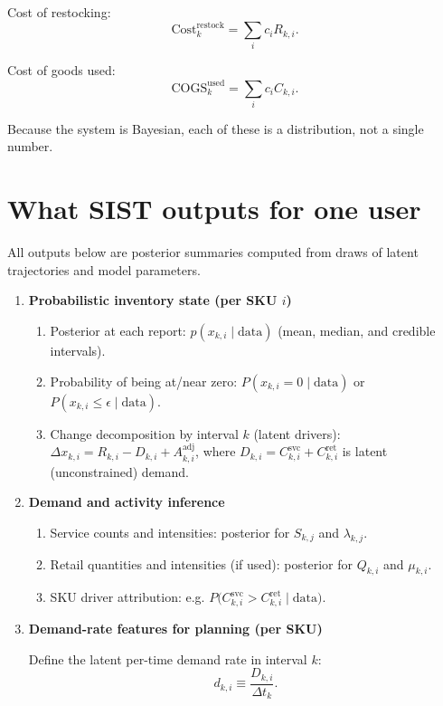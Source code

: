 \documentclass[11pt]{article}
\begin{document}
Cost of restocking:
\[
  \text{Cost}^{\mathrm{restock}}_k = \sum_i c_i R_{k,i}.
\]

Cost of goods used:
\[
  \text{COGS}^{\mathrm{used}}_k = \sum_i c_i C_{k,i}.
\]

Because the system is Bayesian, each of these is a distribution, not a single number.

\section{What SIST outputs for one user}

All outputs below are posterior summaries computed from draws of latent trajectories
and model parameters.

\begin{enumerate}
  \item \textbf{Probabilistic inventory state (per SKU $i$)}
  \begin{enumerate}
    \item Posterior at each report: $p(x_{k,i}\mid\text{data})$ (mean, median, and credible intervals).
    \item Probability of being at/near zero: $P(x_{k,i}=0\mid\text{data})$ or $P(x_{k,i}\le \epsilon\mid\text{data})$.
    \item Change decomposition by interval $k$ (latent drivers):
    $\Delta x_{k,i} = R_{k,i} - D_{k,i} + A^{\mathrm{adj}}_{k,i}$,
    where $D_{k,i}=C^{\mathrm{svc}}_{k,i}+C^{\mathrm{ret}}_{k,i}$ is latent (unconstrained) demand.
  \end{enumerate}

  \item \textbf{Demand and activity inference}
  \begin{enumerate}
    \item Service counts and intensities: posterior for $S_{k,j}$ and $\lambda_{k,j}$.
    \item Retail quantities and intensities (if used): posterior for $Q_{k,i}$ and $\mu_{k,i}$.
    \item SKU driver attribution: e.g.
    $P\bigl(C^{\mathrm{svc}}_{k,i} > C^{\mathrm{ret}}_{k,i}\mid\text{data}\bigr)$.
  \end{enumerate}

  \item \textbf{Demand-rate features for planning (per SKU)}

  Define the latent per-time demand rate in interval $k$:
  \[
    d_{k,i} \equiv \frac{D_{k,i}}{\Delta t_k}.
  \]


\end{enumerate}
\end{document}
